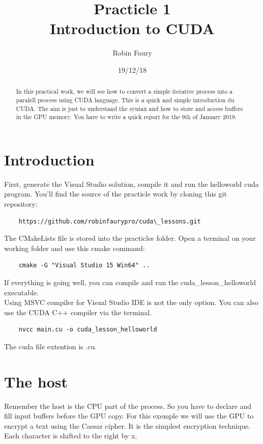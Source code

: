 \documentclass{article}
\begin{document}
\title{Practicle 1\\Introduction to CUDA}
\author{Robin Faury}
\date{19/12/18}
\maketitle

\begin{abstract}
	In this practical work, we will see how to convert a simple iterative process into a paralell process using CUDA language. This is a quick and simple introduction du CUDA. The aim is just to understand the syntax and how to store and access buffers in the GPU memory. You have to write a quick report for the 9th of January 2019.
\end{abstract}


\section{Introduction}
First, generate the Visual Studio solution, compile it and run the helloworld cuda program.
You'll find the source of the practicle work by cloning this git repository:
\begin{lstlisting}
	https://github.com/robinfaurypro/cuda\_lessons.git
\end{lstlisting}
The CMakeLists file is stored into the practicles folder. Open a terminal on your working folder and use this cmake command:
\begin{lstlisting}
	cmake -G "Visual Studio 15 Win64" ..
\end{lstlisting}
If everything is going well, you can compile and run the cuda\_lesson\_helloworld executable.\\
Using MSVC compiler for Visual Studio IDE is not the only option. You can also use the CUDA C++ compiler via the terminal. 
\begin{lstlisting}
	nvcc main.cu -o cuda_lesson_helloworld
\end{lstlisting}
The cuda file extention is .cu.

\section{The host}
Remember the host is the CPU part of the process. So you have to declare and fill input buffers before the GPU copy. For this exemple we will use the GPU to encrypt a text using the Caesar cipher. It is the simplest encryption technique. Each character is shifted to the right by x.
\end{document}
